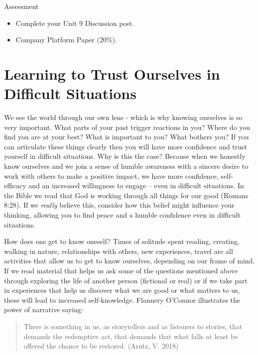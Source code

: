\documentclass[
]{book}
\providecommand{\tightlist}{%
  \setlength{\itemsep}{0pt}\setlength{\parskip}{0pt}}
\begin{document}
\begin{assessment}
{Assessment}

\begin{itemize}
\tightlist
\item
  Complete your Unit 9 Discussion post.\\
\item
  Company Platform Paper (20\%).
\end{itemize}
\end{assessment}

\hypertarget{learning-to-trust-ourselves-in-difficult-situations}{%
\section{Learning to Trust Ourselves in Difficult Situations}\label{learning-to-trust-ourselves-in-difficult-situations}}

We see the world through our own lens - which is why knowing ourselves is so very important. What parts of your past trigger reactions in you? Where do you find you are at your best? What is important to you? What bothers you? If you can articulate these things clearly then you will have more confidence and trust yourself in difficult situations. Why is this the case? Because when we honestly know ourselves and we join a sense of humble awareness with a sincere desire to work with others to make a positive impact, we have more confidence, self-efficacy and an increased willingness to engage -- even in difficult situations. In the Bible we read that God is working through all things for our good (Romans 8:28). If we \emph{really} believe this, consider how this belief might influence your thinking, allowing you to find peace and a humble confidence even in difficult situations.

How does one get to know oneself? Times of solitude spent reading, creating, walking in nature, relationships with others, new experiences, travel are all activities that allow us to get to know ourselves, depending on our frame of mind. If we read material that helps us ask some of the questions mentioned above through exploring the life of another person (fictional or real) or if we take part in experiences that help us discover what we are good or what matters to us, these will lead to increased self-knowledge. Flannery O'Connor illustrates the power of narrative saying:

\begin{quote}
There is something in us, as storytellers and as listeners to stories, that demands the redemptive act, that demands that what falls at least be offered the chance to be restored. (Arntz, V. 2018)
\end{quote}
\end{document}
